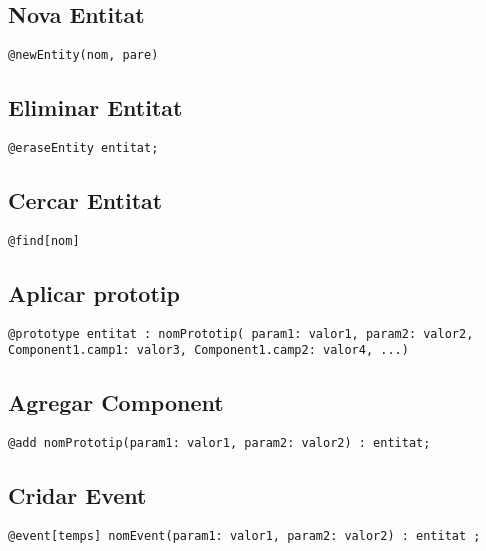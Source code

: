 \subsection{Nova Entitat}

\begin{verbatim}
@newEntity(nom, pare)
\end{verbatim}

\subsection{Eliminar Entitat}

\begin{verbatim}
@eraseEntity entitat;
\end{verbatim}

\subsection{Cercar Entitat}

\begin{verbatim}
@find[nom]
\end{verbatim}

\subsection{Aplicar prototip}

\begin{verbatim}
@prototype entitat : nomPrototip( param1: valor1, param2: valor2, Component1.camp1: valor3, Component1.camp2: valor4, ...)
\end{verbatim}

\subsection{Agregar Component}

\begin{verbatim}
@add nomPrototip(param1: valor1, param2: valor2) : entitat;
\end{verbatim}

\subsection{Cridar Event}

\begin{verbatim}
@event[temps] nomEvent(param1: valor1, param2: valor2) : entitat ;
\end{verbatim}

